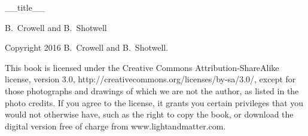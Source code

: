 \begin{titlepage}
	\centering
        {\Huge __title__}

	\vspace{1cm}

        {\Large B.~Crowell and B.~Shotwell}
\end{titlepage}


\noindent Copyright 2016 B.~Crowell and B.~Shotwell.

\vspace{2cm}

\noindent    This book is licensed under the Creative Commons
    Attribution-ShareAlike license, version 3.0,
    http://creativecommons.org/licenses/by-sa/3.0/,
    except for those photographs and
    drawings of which we are not the author, as listed in the photo credits.
    If you agree to the license, it grants you certain privileges that
    you would not otherwise have, such as the right to copy the book,
    or download the digital version free of charge from
    www.lightandmatter.com.

\setcounter{tocdepth}{1} %
\tableofcontents
